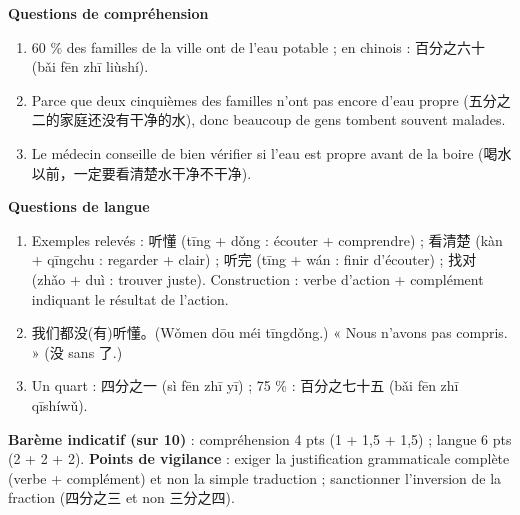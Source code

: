 \documentclass[11pt]{article}
\begin{document}
\begin{corrige}
\textbf{Questions de compréhension}
\begin{enumerate}
\item 60 \% des familles de la ville ont de l'eau potable ; en chinois : 百分之六十 (bǎi fēn zhī liùshí).
\item Parce que deux cinquièmes des familles n'ont pas encore d'eau propre (五分之二的家庭还没有干净的水), donc beaucoup de gens tombent souvent malades.
\item Le médecin conseille de bien vérifier si l'eau est propre avant de la boire (喝水以前，一定要看清楚水干净不干净).
\end{enumerate}
\textbf{Questions de langue}
\begin{enumerate}
\item Exemples relevés : 听懂 (tīng + dǒng : écouter + comprendre) ; 看清楚 (kàn + qīngchu : regarder + clair) ; 听完 (tīng + wán : finir d'écouter) ; 找对 (zhǎo + duì : trouver juste). Construction : verbe d'action + complément indiquant le résultat de l'action.
\item 我们都没(有)听懂。(Wǒmen dōu méi tīngdǒng.) « Nous n'avons pas compris. » (没 sans 了.)
\item Un quart : 四分之一 (sì fēn zhī yī) ; 75 \% : 百分之七十五 (bǎi fēn zhī qīshíwǔ).
\end{enumerate}
\textbf{Barème indicatif (sur 10)} : compréhension 4 pts (1 + 1,5 + 1,5) ; langue 6 pts (2 + 2 + 2). \textbf{Points de vigilance} : exiger la justification grammaticale complète (verbe + complément) et non la simple traduction ; sanctionner l'inversion de la fraction (四分之三 et non 三分之四).
\end{corrige}
\end{document}
